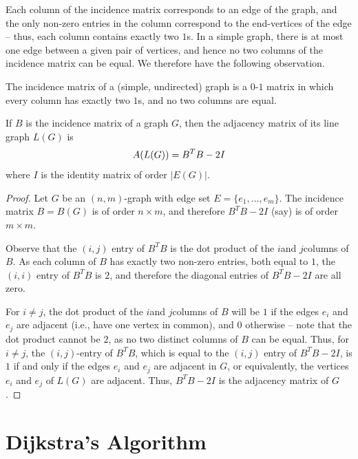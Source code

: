 Each column of the incidence matrix corresponds to an edge of the graph, and the only non-zero entries in the column correspond to the end-vertices of the edge -- thus, each column contains exactly two $1$s. In a simple graph, there is at most one edge between a given pair of vertices, and hence no two columns of the incidence matrix can be equal. We therefore have the following observation.

\begin{Observation}
The incidence matrix of a (simple, undirected) graph is a $0$-$1$ matrix in which every column has exactly two $1$s, and no two columns are equal.
\end{Observation}

\begin{Theorem}
If $B$ is the incidence matrix of a graph $G$, then the adjacency matrix of its line graph $L(G)$ is
\begin{equation*}
    A\pqty{L(G)} = B^T B - 2I
\end{equation*}
where $I$ is the identity matrix of order $|E(G)|$.
\end{Theorem}

\begin{proof}
Let $G$ be an $(n, m)$-graph with edge set $E = \{e_1, \ldots, e_m\}$. The incidence matrix $B = B(G)$ is of order $n \times m$, and therefore $B^T B - 2I$ (say) is of order $m \times m$.

Observe that the $(i, j)$ entry of $B^T B$ is the dot product of the $i$\nth and $j$\nth columns of $B$. As each column of $B$ has exactly two non-zero entries, both equal to $1$, the $(i, i)$ entry of $B^T B$ is $2$, and therefore the diagonal entries of $B^T B - 2I$ are all zero.

For $i \ne j$, the dot product of the $i$\nth and $j$\nth columns of $B$ will be $1$ if the edges $e_i$ and $e_j$ are adjacent (i.e., have one vertex in common), and $0$ otherwise -- note that the dot product cannot be $2$, as no two distinct columns of $B$ can be equal. Thus, for $i \ne j$, the $(i, j)$-entry of $B^T B$, which is equal to the $(i, j)$ entry of $B^T B - 2I$, is $1$ if and only if the edges $e_i$ and $e_j$ are adjacent in $G$, or equivalently, the vertices $e_i$ and $e_j$ of $L(G)$ are adjacent. Thus, $B^T B - 2I$ is the adjacency matrix of $G$.
\end{proof}

\section{Dijkstra's Algorithm}\label{sec:Dijkstra}

